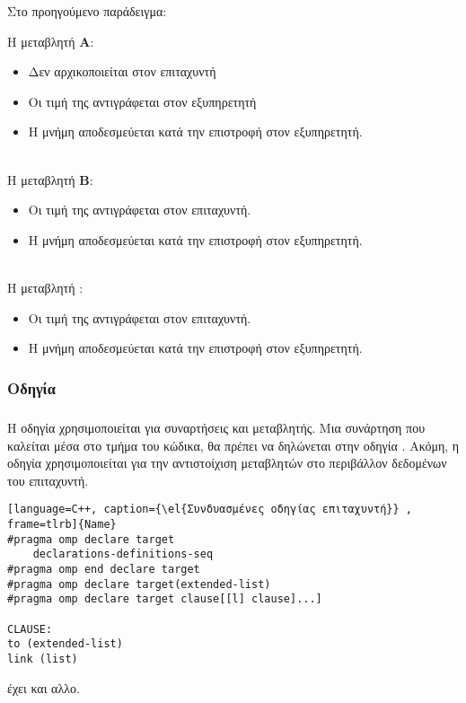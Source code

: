 Στο προηγούμενο παράδειγμα:

Η μεταβλητή \textbf{Α}:
\begin{itemize}
  \item Δεν αρχικοποιείται στον επιταχυντή
  \item Οι τιμή της αντιγράφεται στον εξυπηρετητή
  \item Η μνήμη αποδεσμεύεται κατά την επιστροφή στον εξυπηρετητή.
\end{itemize}
\ \\
Η μεταβλητή \textbf{Β}:
\begin{itemize}
  \item Οι τιμή της αντιγράφεται στον επιταχυντή.
  \item Η μνήμη αποδεσμεύεται κατά την επιστροφή στον εξυπηρετητή.
\end{itemize}
\ \\
Η μεταβλητή \textbf{}:
\begin{itemize}
  \item Οι τιμή της αντιγράφεται στον επιταχυντή.
  \item Η μνήμη αποδεσμεύεται κατά την επιστροφή στον εξυπηρετητή.
\end{itemize}

\subsubsection{Οδηγία \emph{}}
\subparagraph{}
Η οδηγία \emph{} χρησιμοποιείται για συναρτήσεις και μεταβλητής. Μια συνάρτηση που καλείται μέσα στο τμήμα του \emph{} κώδικα, θα πρέπει να δηλώνεται στην οδηγία \emph{}. Ακόμη, η οδηγία χρησιμοποιείται για την αντιστοίχιση \emph{} μεταβλητών στο περιβάλλον δεδομένων του επιταχυντή.



\begin{lstlisting}[language=C++, caption={\el{Συνδυασμένες οδηγίας επιταχυντή}} , frame=tlrb]{Name}
#pragma omp declare target
	declarations-definitions-seq
#pragma omp end declare target
#pragma omp declare target(extended-list)
#pragma omp declare target clause[[l] clause]...]

CLAUSE:
to (extended-list)
link (list)
\end{lstlisting}

\textbf{} έχει και αλλο.
